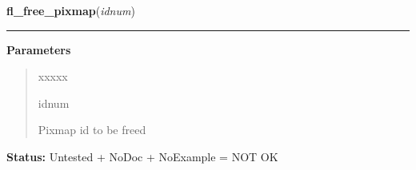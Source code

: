     \label{xformslib:library:fl_free_pixmap}

    \vspace{0.5ex}

\hspace{.8\funcindent}\begin{boxedminipage}{\funcwidth}

    \raggedright \textbf{fl\_free\_pixmap}(\textit{idnum})

    \vspace{-1.5ex}

    \rule{\textwidth}{0.5\fboxrule}
\setlength{\parskip}{2ex}
\setlength{\parskip}{1ex}
      \textbf{Parameters}
      \vspace{-1ex}

      \begin{quote}
        \begin{Ventry}{xxxxx}

          \item[idnum]

          Pixmap id to be freed

        \end{Ventry}

      \end{quote}

\textbf{Status:} Untested + NoDoc + NoExample = NOT OK



    \end{boxedminipage}

    \label{xformslib:library:fl_create_box}

    \vspace{0.5ex}

